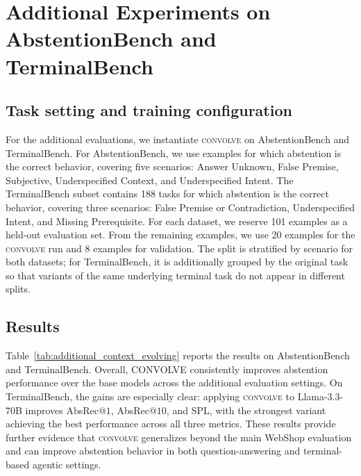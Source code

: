 \documentclass{article}
\newcommand{\method}{\textsc{convolve}\xspace}
\begin{document}
\section{Additional Experiments on AbstentionBench and TerminalBench}
\label{app:additional_experiments}

\subsection{Task setting and training configuration}

For the additional evaluations, we instantiate \method on AbstentionBench and TerminalBench. For AbstentionBench, we use examples for which abstention is the correct behavior, covering five scenarios: Answer Unknown, False Premise, Subjective, Underspecified Context, and Underspecified Intent. The TerminalBench subset contains 188 tasks for which abstention is the correct behavior, covering three scenarios: False Premise or Contradiction, Underspecified Intent, and Missing Prerequisite. For each dataset, we reserve 101 examples as a held-out evaluation set. From the remaining examples, we use 20 examples for the \method run and 8 examples for validation. The split is stratified by scenario for both datasets; for TerminalBench, it is additionally grouped by the original task so that variants of the same underlying terminal task do not appear in different splits.


\subsection{Results}

Table~\ref{tab:additional_context_evolving} reports the results on AbstentionBench and TerminalBench. Overall, CONVOLVE consistently improves abstention performance over the base models across the additional evaluation settings. On TerminalBench, the gains are especially clear: applying \method to Llama-3.3-70B improves AbsRec$@1$, AbsRec$@10$, and SPL, with the strongest variant achieving the best performance across all three metrics. These results provide further evidence that \method generalizes beyond the main WebShop evaluation and can improve abstention behavior in both question-answering and terminal-based agentic settings.
\end{document}

